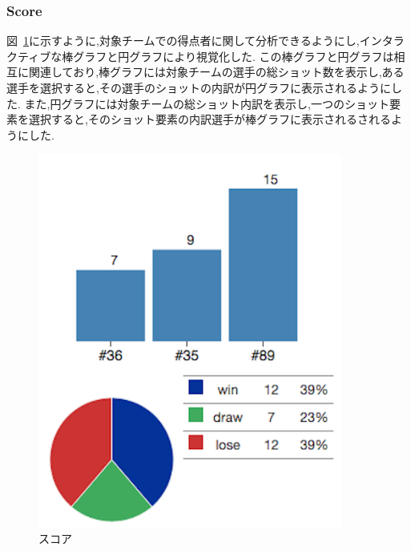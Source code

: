 \documentclass[sotsuron]{kuee}
\begin{document}
			\subsubsection{Score}
				図~\ref{fig:score}に示すように,対象チームでの得点者に関して分析できるようにし,インタラクティブな棒グラフと円グラフにより視覚化した. 
				この棒グラフと円グラフは相互に関連しており,棒グラフには対象チームの選手の総ショット数を表示し,ある選手を選択すると,その選手のショットの内訳が円グラフに表示されるようにした. また,円グラフには対象チームの総ショット内訳を表示し,一つのショット要素を選択すると,そのショット要素の内訳選手が棒グラフに表示されるされるようにした. 
					\begin{figure}
						\begin{center}
							\includegraphics[width=10cm]{./png/score.png}
						\end{center}
						\caption{スコア}
				  		\label{fig:score}
					\end{figure}
\end{document}
